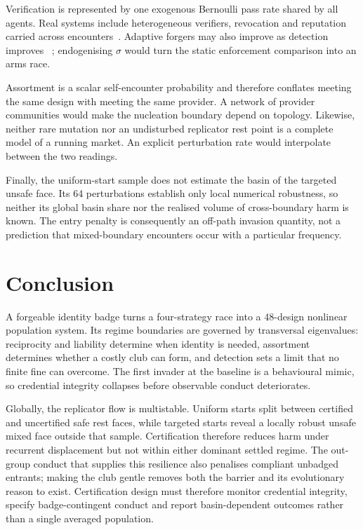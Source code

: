 \documentclass[a4paper,fleqn,longmktitle]{cas-sc}
\theoremstyle{plain}
\theoremstyle{definition}
\begin{document}
Verification is represented by one exogenous Bernoulli pass rate shared by all
agents. Real systems include heterogeneous verifiers, revocation and
reputation carried across encounters~\citep{santos2018social,yue2025reputation}.
Adaptive forgers may also improve as detection improves
~\citep{jovanovic2024watermarkstealing}; endogenising $\sigma$ would turn the
static enforcement comparison into an arms race.

Assortment is a scalar self-encounter probability and therefore conflates
meeting the same design with meeting the same provider. A network of provider
communities would make the nucleation boundary depend on topology. Likewise,
neither rare mutation nor an undisturbed replicator rest point is a complete
model of a running market. An explicit perturbation rate would interpolate
between the two readings.

Finally, the uniform-start sample does not estimate the basin of the targeted
unsafe face. Its 64 perturbations establish only local numerical robustness,
so neither its global basin share nor the realised volume of cross-boundary
harm is known. The entry penalty is consequently an off-path invasion
quantity, not a prediction that mixed-boundary encounters occur with a
particular frequency.
\section{Conclusion}
\label{sec:conclusion}

A forgeable identity badge turns a four-strategy race into a 48-design
nonlinear population system. Its regime boundaries are governed by
transversal eigenvalues: reciprocity and liability determine when identity is
needed, assortment determines whether a costly club can form, and detection
sets a limit that no finite fine can overcome. The first invader at the
baseline is a behavioural mimic, so credential integrity collapses before
observable conduct deteriorates.

Globally, the replicator flow is multistable. Uniform starts split between
certified and uncertified safe rest faces, while targeted starts reveal a
locally robust unsafe mixed face outside that sample. Certification therefore
reduces harm under recurrent displacement but not within either dominant
settled regime. The out-group conduct that supplies this resilience also
penalises compliant unbadged entrants; making the club gentle removes both the
barrier and its evolutionary reason to exist. Certification design must
therefore monitor credential integrity, specify badge-contingent conduct and
report basin-dependent outcomes rather than a single averaged population.
\end{document}
